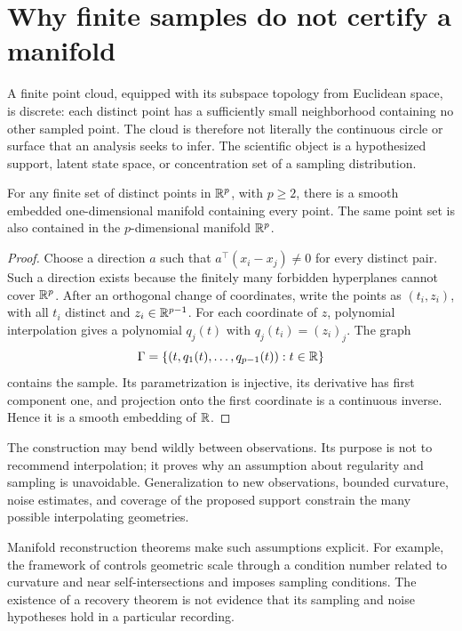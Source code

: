 \section{Why finite samples do not certify a manifold}
A finite point cloud, equipped with its subspace topology from Euclidean space, is discrete: each distinct point has a sufficiently small neighborhood containing no other sampled point. The cloud is therefore not literally the continuous circle or surface that an analysis seeks to infer. The scientific object is a hypothesized support, latent state space, or concentration set of a sampling distribution.

\begin{proposition}\label{prop:12-interpolation}
For any finite set of distinct points in \(\mathbb{R}^p\), with \(p\geq 2\), there is a smooth embedded one-dimensional manifold containing every point. The same point set is also contained in the \(p\)-dimensional manifold \(\mathbb{R}^p\).
\end{proposition}
\begin{proof}
Choose a direction \(a\) such that \(a^\top(x_i-x_j)\ne0\) for every distinct pair. Such a direction exists because the finitely many forbidden hyperplanes cannot cover \(\mathbb{R}^p\). After an orthogonal change of coordinates, write the points as \((t_i,z_i)\), with all \(t_i\) distinct and \(z_i\in\mathbb{R}^{p-1}\). For each coordinate of \(z\), polynomial interpolation gives a polynomial \(q_j(t)\) with \(q_j(t_i)=(z_i)_j\). The graph
\[
\Gamma=\{(t,q_1(t),\ldots,q_{p-1}(t)):t\in\mathbb{R}\}
\]
contains the sample. Its parametrization is injective, its derivative has first component one, and projection onto the first coordinate is a continuous inverse. Hence it is a smooth embedding of \(\mathbb{R}\).
\end{proof}
The construction may bend wildly between observations. Its purpose is not to recommend interpolation; it proves why an assumption about regularity and sampling is unavoidable. Generalization to new observations, bounded curvature, noise estimates, and coverage of the proposed support constrain the many possible interpolating geometries.

Manifold reconstruction theorems make such assumptions explicit. For example, the framework of \citet{ev_niyogi2008} controls geometric scale through a condition number related to curvature and near self-intersections and imposes sampling conditions. The existence of a recovery theorem is not evidence that its sampling and noise hypotheses hold in a particular recording.

